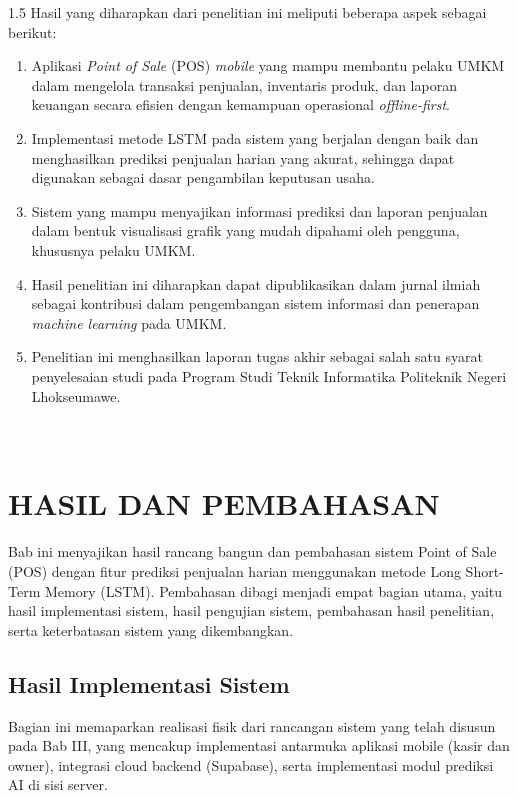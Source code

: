 \documentclass[12pt, a4paper, onecolumn, oneside]{report}
\begin{document}
\begin{spacing}{1.5}
Hasil yang diharapkan dari penelitian ini meliputi beberapa aspek sebagai berikut:
\begin{enumerate}
    \item Aplikasi \textit{Point of Sale} (POS) \textit{mobile} yang mampu membantu pelaku UMKM dalam mengelola transaksi penjualan, inventaris produk, dan laporan keuangan secara efisien dengan kemampuan operasional \textit{offline-first}.
    \item Implementasi metode LSTM pada sistem yang berjalan dengan baik dan menghasilkan prediksi penjualan harian yang akurat, sehingga dapat digunakan sebagai dasar pengambilan keputusan usaha.
    \item Sistem yang mampu menyajikan informasi prediksi dan laporan penjualan dalam bentuk visualisasi grafik yang mudah dipahami oleh pengguna, khususnya pelaku UMKM.
    \item Hasil penelitian ini diharapkan dapat dipublikasikan dalam jurnal ilmiah sebagai kontribusi dalam pengembangan sistem informasi dan penerapan \textit{machine learning} pada UMKM.
    \item Penelitian ini menghasilkan laporan tugas akhir sebagai salah satu syarat penyelesaian studi pada Program Studi Teknik Informatika Politeknik Negeri Lhokseumawe.
\end{enumerate}

\chapter[HASIL DAN PEMBAHASAN]{\\ HASIL DAN PEMBAHASAN}

Bab ini menyajikan hasil rancang bangun dan pembahasan sistem Point of Sale (POS) dengan fitur prediksi penjualan harian menggunakan metode Long Short-Term Memory (LSTM). Pembahasan dibagi menjadi empat bagian utama, yaitu hasil implementasi sistem, hasil pengujian sistem, pembahasan hasil penelitian, serta keterbatasan sistem yang dikembangkan.

\section{Hasil Implementasi Sistem}

Bagian ini memaparkan realisasi fisik dari rancangan sistem yang telah disusun pada Bab III, yang mencakup implementasi antarmuka aplikasi mobile (kasir dan owner), integrasi cloud backend (Supabase), serta implementasi modul prediksi AI di sisi server.


\end{spacing}
\end{document}
